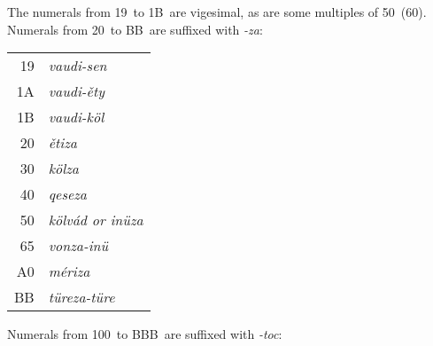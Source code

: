 \documentclass[grammar]{subfiles}
\begin{document}

	\newpage
	The numerals from 19\duo\ to 1B\duo\ are vigesimal, as are some multiples of 50\duo\ (60\dec). Numerals from 20\duo\ to BB\duo\ are suffixed with \emph{-za}:

	\begin{exe}
		\ex
		\begin{tabular}[t]{r >{\itshape}l}
			19\duo & vaudi-sen\\
			1A\duo & vaudi-ěty\\
			1B\duo & vaudi-köl\\
			20\duo & ětiza\\
			30\duo & kölza\\
			40\duo & qeseza\\
			50\duo & kölvád \textup{or} inüza\\
			65\duo & vonza-inü\\
			A0\duo & mériza\\
			BB\duo & türeza-türe\\
		\end{tabular}
	\end{exe}

	Numerals from 100\duo\ to BBB\duo\ are suffixed with \emph{-toc}:
\end{document}
